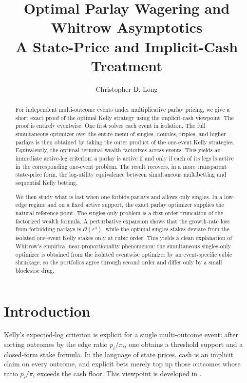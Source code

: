 \documentclass[11pt]{article}
\title{Optimal Parlay Wagering and Whitrow Asymptotics\\
\large A State-Price and Implicit-Cash Treatment}
\author{Christopher D. Long}
\date{}
\numberwithin{equation}{section}
\theoremstyle{remark}
\theoremstyle{definition}
\newcommand{\1}{\mathbf{1}}
\newcommand{\OO}{\mathcal{O}}
\newcommand{\eps}{\varepsilon}
\begin{document}
\maketitle

\begin{abstract}
For independent multi-outcome events under multiplicative parlay pricing, we give a short exact proof of the optimal Kelly strategy using the implicit-cash viewpoint. The proof is entirely eventwise. One first solves each event in isolation. The full simultaneous optimizer over the entire menu of singles, doubles, triples, and higher parlays is then obtained by taking the outer product of the one-event Kelly strategies. Equivalently, the optimal terminal wealth factorizes across events. This yields an immediate active-leg criterion: a parlay is active if and only if each of its legs is active in the corresponding one-event problem. The result recovers, in a more transparent state-price form, the log-utility equivalence between simultaneous multibetting and sequential Kelly betting.

We then study what is lost when one forbids parlays and allows only singles. In a low-edge regime and on a fixed active support, the exact parlay optimizer supplies the natural reference point. The singles-only problem is a first-order truncation of the factorized wealth formula. A perturbative expansion shows that the growth-rate loss from forbidding parlays is $\OO(\eps^4)$, while the optimal singles stakes deviate from the isolated one-event Kelly stakes only at cubic order. This yields a clean explanation of Whitrow's empirical near-proportionality phenomenon: the simultaneous singles-only optimizer is obtained from the isolated eventwise optimizer by an event-specific cubic shrinkage, so the portfolios agree through second order and differ only by a small blockwise drag.
\end{abstract}

\section{Introduction}
Kelly's expected-log criterion is explicit for a single multi-outcome event: after sorting outcomes by the edge ratio $p_i/\pi_i$, one obtains a threshold support and a closed-form stake formula. In the language of state prices, cash is an implicit claim on every outcome, and explicit bets merely top up those outcomes whose ratio $p_i/\pi_i$ exceeds the cash floor. This viewpoint is developed in \cite{LongSingle2026}.
\end{document}
